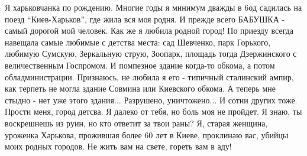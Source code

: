 \begin{itemize}
Я харьковчанка по рождению. Многие годы я минимум дважды в 6од садилась на
поезд \enquote{Киев-Харьков}, где жила вся моя родня. И прежде всего БАБУШКА - самый
дорогой мой человек. Как же я любила родной город! По приезду всегда навещала
самые любимые с детства места: сад Шевченко, парк Горького, любимую Сумскую,
Зеркальную струю, Зоопарк, площадь тогда Дзержинского с величественным
Госпромом. И помпезное здание когда-то обкома, а потом обладминистрации.
Признаюсь, не любила я его - типичный сталинский ампир, как терпеть не могла
здание Совмина или Киевского обкома. А теперь мне стыдно - нет уже этого
здания... Разрушено, уничтожено... И сотни других тоже. Прости меня, город
детсва. Я далеко от тебя, но боль моя не пройдет. Я знаю, ты воскрешнешь из
руин, но кто ответит за твои раны? Я, старая женщина, уроженка Харькова,
прожившая более 60 лет в Киеве, проклинаю вас, убийцы моих родных городов. Не
жить вам на свете, гореть вам в аду!


\end{itemize} %
